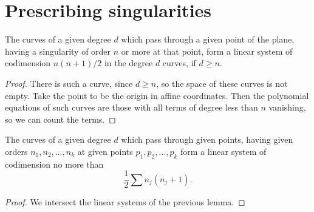 \section{Prescribing singularities}
\begin{lemma}
The curves of a given degree \(d\) which pass through a given point of the plane, having a singularity of order \(n\) or more at that point, form a linear system of codimension \(n(n+1)/2\) in the degree \(d\) curves, if \(d\ge n\).
\end{lemma}
\begin{proof}
There is such a curve, since \(d\ge n\), so the space of these curves is not empty.
Take the point to be the origin in affine coordinates.
Then the polynomial equations of such curves are those with all terms of degree less than \(n\) vanishing, so we can count the terms.
\end{proof}
\begin{theorem}\label{theorem:prescribe.singularities}
The curves of a given degree \(d\) which pass through given points, having given orders \(n_1,n_2,\dots,n_k\) at given points \(p_1,p_2,\dots,p_k\) form a linear system of codimension no more than 
\[
\frac{1}{2}\sum n_j(n_j+1).
\]
\end{theorem}
\begin{proof}
We intersect the linear systems of the previous lemma.
\end{proof}


